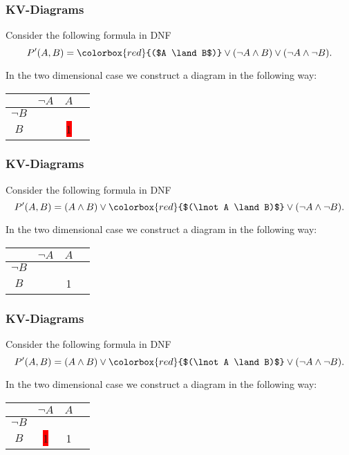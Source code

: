 \documentclass{beamer}
\theoremstyle{remark}
\begin{document}
\begin{frame}
	\frametitle{KV-Diagrams}
	Consider the following formula in DNF
	\[ P^{\prime}(A, B) = \colorbox{red}{($A \land B$)} \lor (\lnot A \land B) \lor (\lnot A \land \lnot B).\]
	
	In the two dimensional case we construct a diagram in the following way:
	
	\vspace{1.5em}
	
	\begin{center}
	\begin{tabular}{c|c|c|c}
		& $\lnot A$ & $A$ \\ \hline
		$\lnot B$ & &  \\ \hline
		$B$ & &  \colorbox{red}{1} \\ \hline
	\end{tabular}
	\end{center}
\end{frame}

\begin{frame}
	\frametitle{KV-Diagrams}
	Consider the following formula in DNF
	\[ P^{\prime}(A, B) = (A \land B) \lor \colorbox{red}{$(\lnot A \land B)$} \lor (\lnot A \land \lnot B).\]
	
	In the two dimensional case we construct a diagram in the following way:
	
	\vspace{1.5em}
	
	\begin{center}
	\begin{tabular}{c|c|c|c}
		& $\lnot A$ & $A$ \\ \hline
		$\lnot B$ & &  \\ \hline
		$B$ & &  1\\ \hline
	\end{tabular}
	\end{center}
\end{frame}

\begin{frame}
	\frametitle{KV-Diagrams}
	Consider the following formula in DNF
	\[ P^{\prime}(A, B) = (A \land B) \lor \colorbox{red}{$(\lnot A \land B)$} \lor (\lnot A \land \lnot B).\]
	
	In the two dimensional case we construct a diagram in the following way:
	
	\vspace{1.5em}
	
	\begin{center}
	\begin{tabular}{c|c|c|c}
		& $\lnot A$ & $A$ \\ \hline
		$\lnot B$ & &  \\ \hline
		$B$ & \colorbox{red}{1}&  1\\ \hline
	\end{tabular}
	\end{center}
\end{frame}
\end{document}
